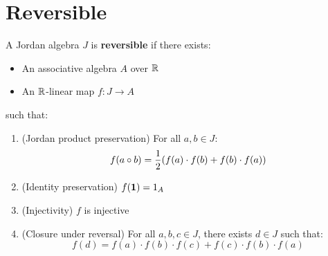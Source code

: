 \section{Reversible}

\begin{definition}[IsReversible]
A Jordan algebra $J$ is \textbf{reversible} if there exists:
\begin{itemize}
  \item An associative algebra $A$ over $\mathbb{R}$
  \item An $\mathbb{R}$-linear map $f : J \to A$
\end{itemize}
such that:
\begin{enumerate}
  \item (Jordan product preservation) For all $a, b \in J$:
    \[ f(a \circ b) = \frac{1}{2}(f(a) \cdot f(b) + f(b) \cdot f(a)) \]
  \item (Identity preservation) $f(\mathbf{1}) = 1_A$
  \item (Injectivity) $f$ is injective
  \item (Closure under reversal) For all $a, b, c \in J$, there exists $d \in J$ such that:
    \[ f(d) = f(a) \cdot f(b) \cdot f(c) + f(c) \cdot f(b) \cdot f(a) \]
\end{enumerate}
\end{definition}
